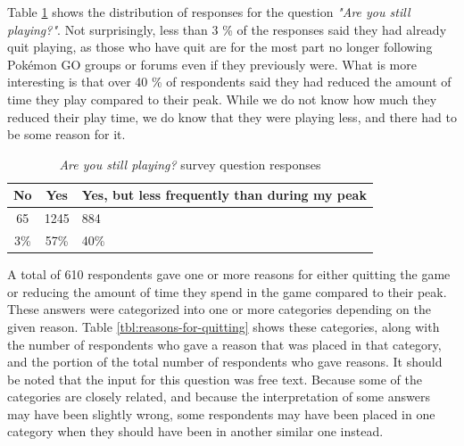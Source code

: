 Table \ref{tbl:still-playing} shows the distribution of responses for the question \emph{"Are you still playing?"}. Not surprisingly, less than 3 \% of the responses said they had already quit playing, as those who have quit are for the most part no longer following Pokémon GO groups or forums even if they previously were. What is more interesting is that over 40 \% of respondents said they had reduced the amount of time they play compared to their peak. While we do not know how much they reduced their play time, we do know that they were playing less, and there had to be some reason for it.

\begin{table}[h]
	\centering
	\caption{\emph{Are you still playing?} survey question responses}
	\label{tbl:still-playing}
	\begin{tabular}{|c|c|l|}
		\hline
		\textbf{No} & \textbf{Yes} & \textbf{Yes, but less frequently than during my peak}\\
		\hline\hline
		65 & 1245 & 884\\
		3\% & 57\% & 40\%\\\hline
	\end{tabular}
\end{table}

A total of 610 respondents gave one or more reasons for either quitting the game or reducing the amount of time they spend in the game compared to their peak. These answers were categorized into one or more categories depending on the given reason. Table \ref{tbl:reasons-for-quitting} shows these categories, along with the number of respondents who gave a reason that was placed in that category, and the portion of the total number of respondents who gave reasons. It should be noted that the input for this question was free text. Because some of the categories are closely related, and because the interpretation of some answers may have been slightly wrong, some respondents may have been placed in one category when they should have been in another similar one instead.

